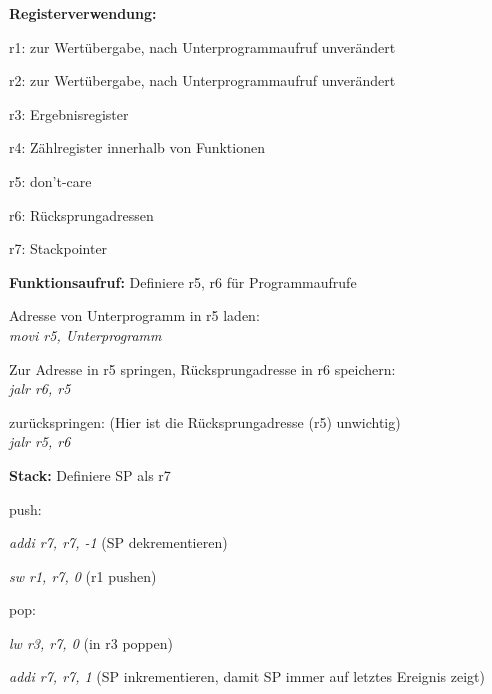 \documentclass[fleqn, a4paper, 11pt]{article}       %
\begin{document}
 \textbf{Registerverwendung:}
 \begin{compactitem}
     \item r1: zur Wertübergabe, nach Unterprogrammaufruf unverändert
     \item r2: zur Wertübergabe, nach Unterprogrammaufruf unverändert
     \item r3: Ergebnisregister
     \item r4: Zählregister innerhalb von Funktionen
     \item r5: don't-care
     \item r6: Rücksprungadressen
     \item r7: Stackpointer
 \end{compactitem}
 \vspace{0.25cm}
 \noindent \textbf{Funktionsaufruf:}
     Definiere r5, r6 für Programmaufrufe
     \begin{compactenum}
     \item Adresse von Unterprogramm in r5 laden:\\
         \emph{movi r5, Unterprogramm}
     \item Zur Adresse in r5 springen, Rücksprungadresse in r6 speichern:\\
         \emph{jalr r6, r5}
     \item zurückspringen: (Hier ist die Rücksprungadresse (r5) unwichtig)\\
         \emph{jalr r5, r6 }
     \end{compactenum}
     
\vspace{0.25cm}
      
 \noindent \textbf{Stack:}
     Definiere SP als r7
     \begin{compactitem}
         \item push:
         \begin {compactitem}
                  \item \emph{addi r7, r7, -1}           (SP dekrementieren)
                   \item \emph{sw  r1, r7, 0 }            (r1 pushen)
           \end{compactitem}         
         \item pop:
             \begin{compactitem}
                   \item \emph{lw r3, r7, 0 }             (in r3 poppen) 
                   \item \emph{addi r7, r7, 1  }          (SP inkrementieren, damit SP immer auf letztes Ereignis zeigt)
             \end{compactitem}                                 
         \end{compactitem}  
 
\end{document}

